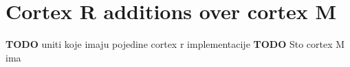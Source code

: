\chapter{Cortex R additions over cortex M}
\label{cortex_r_additions}
\textbf{TODO} uniti koje imaju pojedine cortex r implementacije
\textbf{TODO} Sto cortex M ima